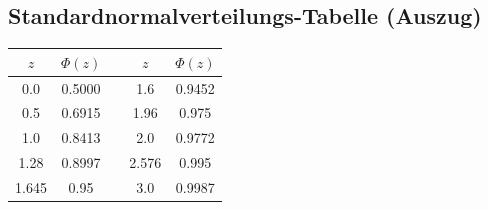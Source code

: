 \documentclass[12pt, a4paper, titlepage, ngerman]{scrartcl}
\begin{document}
\subsection{Standardnormalverteilungs-Tabelle (Auszug)}

\begin{table}[h]
  \centering
  \begin{tabular}{ccccc}
    $z$ & $\Phi(z)$ & & $z$ & $\Phi(z)$ \\
    \hline
    0.0 & 0.5000 & & 1.6 & 0.9452 \\
    0.5 & 0.6915 & & 1.96 & 0.975 \\
    1.0 & 0.8413 & & 2.0 & 0.9772 \\
    1.28 & 0.8997 & & 2.576 & 0.995 \\
    1.645 & 0.95 & & 3.0 & 0.9987
  \end{tabular}
\end{table}
\end{document}
